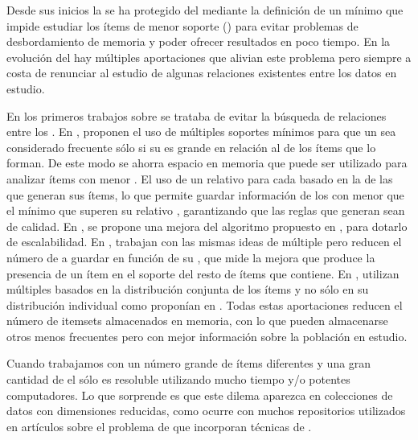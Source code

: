 Desde sus inicios la \ARM se ha protegido del \dilemaIR mediante la definición de un \soporte mínimo que impide estudiar los ítems de menor soporte (\irs) para evitar problemas de desbordamiento de memoria y poder ofrecer resultados en poco tiempo. En la evolución del \ARM hay múltiples aportaciones que alivian este problema pero siempre a costa de renunciar al estudio de algunas relaciones existentes entre los datos en estudio.

En los primeros trabajos sobre \ARM se trataba de evitar la búsqueda de relaciones entre los \irs \citep{AgrawalImielinskiSwami-MiningAssociationRulesBetweenSetsOfItemsInLargeDB-1993,AgrawalSrikant-FastAlgorithmsForMiningAssociationRules-1994,ParkChenYu-UsingAHashBasedMethod-1997}. En \cite{LiuHsuMa-ARMWithMultipleMS-1999}, proponen el uso de múltiples soportes mínimos para que un \itemset sea considerado frecuente sólo si su \soporte es grande en relación al \soporte de los ítems que lo forman. De este modo se ahorra espacio en memoria que puede ser utilizado para analizar ítems con menor \soporte. El uso de un \soporte relativo para cada \itemset basado en la \confianza de las \ars que generan sus ítems, lo que permite guardar información de los \itemsets con menor \soporte que el \soporte mínimo que superen su \soporte relativo \citep{YunHaHwangRyu-MiningAROnSignificantRareDataUsingRelativeSupport-2003}, garantizando que las reglas que generan sean de calidad. En \cite{HuChen-MiningARwithMMS-2006}, se propone una mejora del algoritmo propuesto en \cite{LiuHsuMa-ARMWithMultipleMS-1999}, para dotarlo de escalabilidad. En \cite{TsengLin-EfficientMiningOfAR-2007}, trabajan con las mismas ideas de \soporte múltiple pero reducen el número de \itemsets a guardar en función de su \lift, que mide la mejora que produce la presencia de un ítem en el soporte del resto de ítems que contiene. En \cite{KiranReddy-ImprovedMultipleMSBasedAppMineRareAR-2009}, utilizan múltiples \soportes basados en la distribución conjunta de los ítems y no sólo en su distribución individual como proponían en \cite{LiuHsuMa-ARMWithMultipleMS-1999}. Todas estas aportaciones reducen el número de itemsets almacenados en memoria, con lo que pueden almacenarse otros \itemsets menos frecuentes pero con mejor información sobre la población en estudio.

Cuando trabajamos con un número grande de ítems diferentes y una gran cantidad de \transacciones el \dilemaIR sólo es resoluble utilizando mucho tiempo y/o potentes computadores. Lo que sorprende es que este dilema aparezca en colecciones de datos con dimensiones reducidas, como ocurre con muchos repositorios utilizados en artículos sobre el problema de \Clasificacion que incorporan técnicas de \arm.

